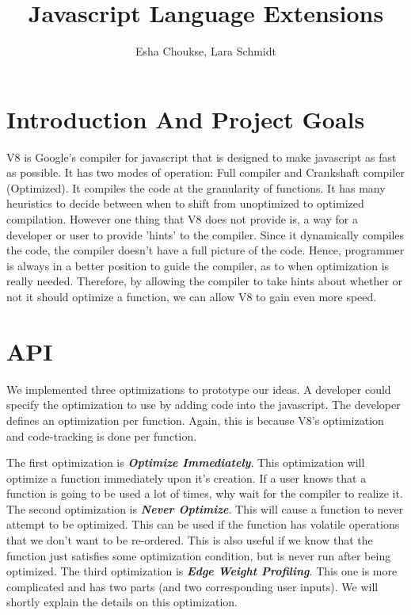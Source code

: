 \documentclass[twocolumn,showpacs,%
  nofootinbib,aps,superscriptaddress,%
  eqsecnum,prd,notitlepage,showkeys,10pt]{revtex4-1}
\begin{document}
\title{Javascript Language Extensions}
\author{Esha Choukse, Lara Schmidt}


\maketitle

\section{Introduction And Project Goals} 
V8 is Google's compiler for javascript that is designed to make javascript as fast as possible. It has two modes of operation: Full compiler and Crankshaft compiler (Optimized). It compiles the code at the granularity of functions. It has many heuristics to decide between when to shift from unoptimized to optimized compilation. However one thing that V8 does not provide is, a way for a developer or user to provide 'hints' to the compiler. Since it dynamically compiles the code, the compiler doesn't have a full picture of the code. Hence, programmer is always in a better position to guide the compiler, as to when optimization is really needed. Therefore, by allowing the compiler to take hints about whether or not it should optimize a function, we can allow V8 to gain even more speed.

\section{API}
We implemented three optimizations to prototype our ideas. A developer could specify the optimization to use by adding code into the javascript. The developer defines an optimization per function. Again, this is because V8's optimization and code-tracking is done per function. 

The first optimization is \textbf {\textit{Optimize Immediately}}. This optimization will optimize a function immediately upon it's creation. If a user knows that a function is going to be used a lot of times, why wait for the compiler to realize it. The second optimization is \textbf{\textit{Never Optimize}}. This will cause a function to never attempt to be optimized. This can be used if the function has volatile operations that we don't want to be re-ordered. This is also useful if we know that the function just satisfies some optimization condition, but is never run after being optimized. The third optimization is \textbf{\textit{Edge Weight Profiling}}. This one is more complicated and has two parts (and two corresponding user inputs). We will shortly explain the details on this optimization.
\end{document}
